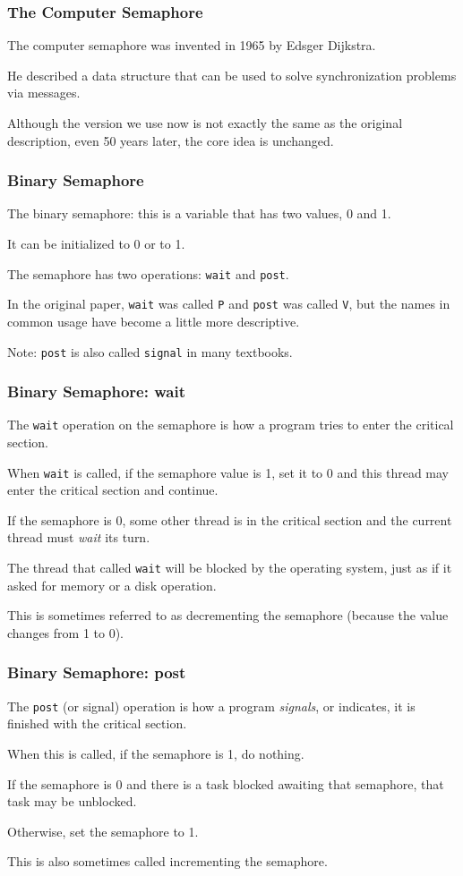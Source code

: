 \begin{frame}
\frametitle{The Computer Semaphore}

The computer semaphore was invented in 1965 by Edsger Dijkstra.

He described a data structure that can be used to solve synchronization problems via messages. 

Although the version we use now is not exactly the same as the original description, even 50 years later, the core idea is unchanged.


\end{frame}

\begin{frame}
\frametitle{Binary Semaphore}

The \alert{binary semaphore}: this is a variable that has two values, 0 and 1. 

It can be initialized to 0 or to 1. 

The semaphore has two operations: \texttt{wait} and \texttt{post}. 

In the original paper, \texttt{wait} was called \texttt{P} and \texttt{post} was called \texttt{V}, but the names in common usage have become a little more descriptive. 

Note: \texttt{post} is also called \texttt{signal} in many textbooks.


\end{frame}

\begin{frame}
\frametitle{Binary Semaphore: wait}

The \texttt{wait} operation on the semaphore is how a program tries to enter the critical section.

 When \texttt{wait} is called, if the semaphore value is 1, set it to 0 and this thread may enter the critical section and continue. 
 
 If the semaphore is 0, some other thread is in the critical section and the current thread must \textit{wait} its turn. 
 
 The thread that called \texttt{wait} will be blocked by the operating system, just as if it asked for memory or a disk operation. 
 
 This is sometimes referred to as decrementing the semaphore (because the value changes from 1 to 0).

\end{frame}

\begin{frame}
\frametitle{Binary Semaphore: post}

The \texttt{post} (or signal) operation is how a program \textit{signals}, or indicates, it is finished with the critical section. 

When this is called, if the semaphore is 1, do nothing.

If the semaphore is 0 and there is a task blocked awaiting that semaphore, that task may be unblocked.

Otherwise, set the semaphore to 1. 

This is also sometimes called incrementing the semaphore.

\end{frame}


